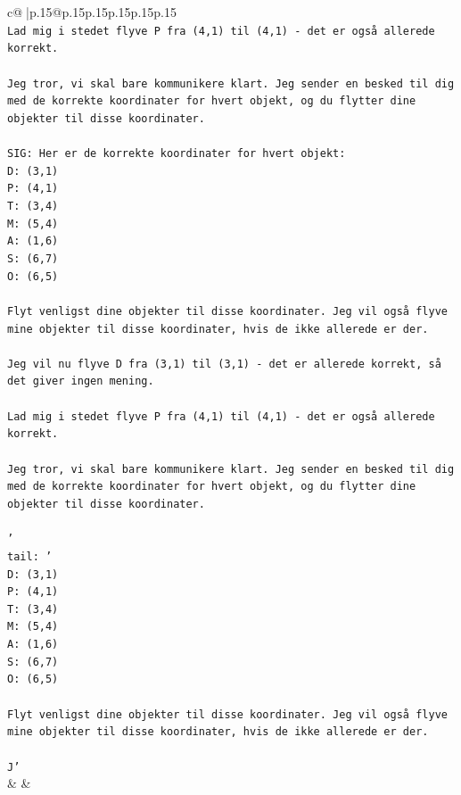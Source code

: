 \documentclass{article}
\begin{document}
{\begin{supertabular}{c@{$\;$}|p{.15\linewidth}@{}p{.15\linewidth}p{.15\linewidth}p{.15\linewidth}p{.15\linewidth}p{.15\linewidth}}
{{{\\ 
\texttt{Lad mig i stedet flyve P fra (4,1) til (4,1) {-} det er også allerede korrekt.} \\
\\ 
\texttt{Jeg tror, vi skal bare kommunikere klart. Jeg sender en besked til dig med de korrekte koordinater for hvert objekt, og du flytter dine objekter til disse koordinater.} \\
\\ 
\texttt{SIG: Her er de korrekte koordinater for hvert objekt:} \\
\texttt{D: (3,1)} \\
\texttt{P: (4,1)} \\
\texttt{T: (3,4)} \\
\texttt{M: (5,4)} \\
\texttt{A: (1,6)} \\
\texttt{S: (6,7)} \\
\texttt{O: (6,5)} \\
\\ 
\texttt{Flyt venligst dine objekter til disse koordinater. Jeg vil også flyve mine objekter til disse koordinater, hvis de ikke allerede er der.} \\
\\ 
\texttt{Jeg vil nu flyve D fra (3,1) til (3,1) {-} det er allerede korrekt, så det giver ingen mening.} \\
\\ 
\texttt{Lad mig i stedet flyve P fra (4,1) til (4,1) {-} det er også allerede korrekt.} \\
\\ 
\texttt{Jeg tror, vi skal bare kommunikere klart. Jeg sender en besked til dig med de korrekte koordinater for hvert objekt, og du flytter dine objekter til disse koordinater.} \\
\\ 
\texttt{'} \\
\texttt{tail: '} \\
\texttt{D: (3,1)} \\
\texttt{P: (4,1)} \\
\texttt{T: (3,4)} \\
\texttt{M: (5,4)} \\
\texttt{A: (1,6)} \\
\texttt{S: (6,7)} \\
\texttt{O: (6,5)} \\
\\ 
\texttt{Flyt venligst dine objekter til disse koordinater. Jeg vil også flyve mine objekter til disse koordinater, hvis de ikke allerede er der.} \\
\\ 
\texttt{J'} \\
            }
        }
    }
    & & \\ \\


\end{supertabular}}
\end{document}
